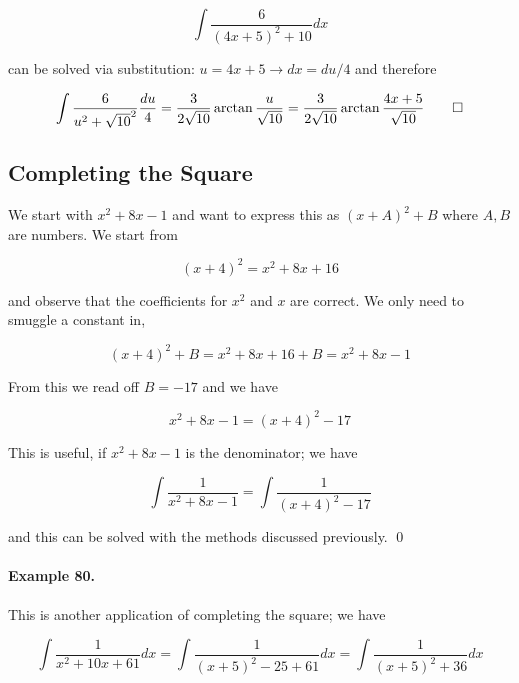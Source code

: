 \begin{equation*}
    \int \frac{6}{(4x + 5)^2 + 10} dx
\end{equation*}

can be solved via substitution: $u= 4x+5 \rightarrow dx = du/4$ and therefore

\begin{equation*}
    \int \frac{6}{u^2 + \sqrt{10}^2} \frac{du}{4} = \frac{3}{2 \sqrt{10}} \arctan \frac{u}{\sqrt{10}} = \frac{3}{2 \sqrt{10}} \arctan \frac{4x+5}{\sqrt{10}} \qed
\end{equation*}

\subsection{Completing the Square}

We start with $x^2 + 8x - 1$ and want to express this as $( x + A )^2 + B$ where $A, B$ are numbers. We start from

\begin{equation*}
    (x + 4)^2 = x^2 + 8x + 16
\end{equation*}

and observe that the coefficients for $x^2$ and $x$ are correct. We only need to smuggle a constant in,

\begin{equation*}
    (x + 4)^2 + B= x^2 + 8x + 16 + B = x^2 + 8x - 1
\end{equation*}

From this we read off $B = - 17$ and we have

\begin{equation*}
    x^2 + 8x - 1 = (x+4)^2 - 17
\end{equation*}

This is useful, if $x^2 + 8x - 1$ is the denominator; we have

\begin{equation*}
    \int \frac{1}{x^2 + 8x - 1} = \int \frac{1}{(x+4)^2 - 17}
\end{equation*}

and this can be solved with the methods discussed previously. \qed

\paragraph{Example 80.} This is another application of completing the square; we have

\begin{equation*}
    \int \frac{1}{x^2 + 10x + 61} dx = \int \frac{1}{(x + 5)^2 - 25 + 61} dx = \int \frac{1}{(x + 5)^2 + 36} dx 
\end{equation*}    
    
